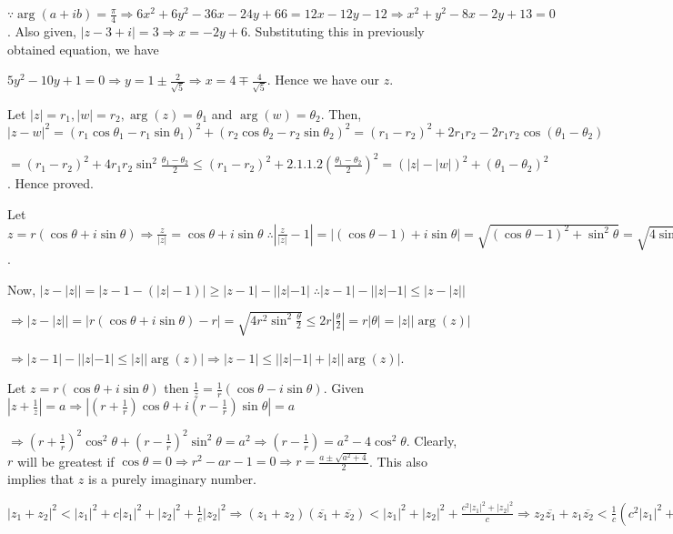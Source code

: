   $\because\arg(a + ib) = \frac{\pi}{4} \Rightarrow 6x^2 + 6y^2 - 36x - 24y + 66 = 12x - 12y - 12
  \Rightarrow x^2 + y^2 - 8x - 2y + 13 = 0$. Also given, $|z - 3 + i| = 3 \Rightarrow x = -2y +
  6$. Substituting this in previously obtained equation, we have

  $5y^2 - 10y + 1 = 0 \Rightarrow y = 1 \pm\frac{2}{\sqrt{5}}\Rightarrow x = 4\mp\frac{4}{\sqrt{5}}$. Hence
  we have our $z$.
\item Let $|z| = r_1, |w| = r_2, \arg(z)= \theta_1$ and $\arg(w) = \theta_2$. Then, $|z - w|^2 =
  (r_1\cos\theta_1 - r_1\sin\theta_1)^2 + (r_2\cos\theta_2 - r_2\sin\theta_2)^2 = (r_1 - r_2)^2 + 2r_1r_2 -
  2r_1r_2\cos(\theta_1 - \theta_2)$

  $= (r_1 - r_2)^2 + 4r_1r_2\sin^2\frac{\theta_1 - \theta_2}{2}\leq (r_1 - r_2)^2 +
  2.1.1.2\left(\frac{\theta_1 - \theta_2}{2}\right)^2 = (|z| - |w|)^2 + (\theta_1 - \theta_2)^2$. Hence
  proved.
\item Let $z = r(\cos\theta + i\sin\theta) \Rightarrow \frac{z}{|z|}= \cos\theta + i\sin\theta\;\therefore
  \left|\frac{z}{|z|} - 1\right| = |(\cos\theta - 1) + i\sin\theta| = \sqrt{(\cos\theta - 1)^2 +
    \sin^2\theta} = \sqrt{4\sin^2\frac{\theta}{2}} = 2|\sin\frac{\theta}{2}|\leq |\theta|$.

  Now, $|z - |z|| = |z - 1 - (|z| - 1)|\geq |z - 1| - ||z| - 1|\;\therefore |z - 1| - ||z| - 1|\leq |z -
  |z||$

  $\Rightarrow |z - |z|| = |r(\cos\theta + i\sin\theta) - r| = \sqrt{4r^2\sin^2\frac{\theta}{2}}\leq
  2r\left|\frac{\theta}{2}\right| = r|\theta| = |z||\arg(z)|$

  $\Rightarrow |z - 1| - ||z| - 1|\leq |z||\arg(z)|\Rightarrow |z - 1|\leq ||z| - 1| + |z||\arg(z)|$.
\item Let $z = r(\cos\theta + i\sin\theta)$ then $\frac{1}{z} = \frac{1}{r}(\cos\theta -
  i\sin\theta)$. Given $\left|z + \frac{1}{z}\right| = a \Rightarrow \left|\left(r +
  \frac{1}{r}\right)\cos\theta + i\left(r - \frac{1}{r}\right)\sin\theta\right| = a$

  $\Rightarrow \left(r + \frac{1}{r}\right)^2\cos^2\theta + \left(r - \frac{1}{r}\right)^2\sin^2\theta =
  a^2 \Rightarrow \left(r - \frac{1}{r}\right) = a^2 - 4\cos^2\theta$. Clearly, $r$ will be greatest if
  $\cos\theta = 0 \Rightarrow r^2 - ar - 1 = 0 \Rightarrow r = \frac{a \pm\sqrt{a^2 + 4}}{2}$. This also
  implies that $z$ is a purely imaginary number.
\item $|z_1 + z_2|^2 < |z_1|^2 + c|z_1|^2 + |z_2|^2 + \frac{1}{c}|z_2|^2 \Rightarrow (z_1 +
  z_2)(\overline{z_1} + \overline{z_2}) < |z_1|^2 + |z_2|^2 + \frac{c^2|z_1|^2 + |z_2|^2}{c} \Rightarrow
  z_2\overline{z_1} + z_1\overline{z_2} < \frac{1}{c}(c^2|z_1|^2 + |z_2|^2)$

